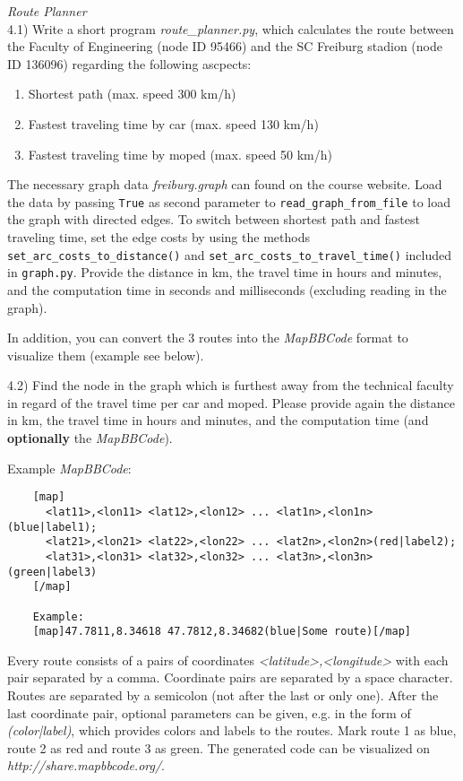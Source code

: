   \textit{Route Planner}\\
4.1)
Write a short program \emph{route\_planner.py}, which calculates the route between the Faculty of Engineering (node ID 95466) and the SC Freiburg stadion (node ID 136096) regarding the following ascpects:

\begin{enumerate} \itemsep-2pt
	\item Shortest path (max. speed 300 km/h)
	\item Fastest traveling time by car (max. speed 130 km/h)
	\item Fastest traveling time by moped (max. speed 50 km/h)
\end{enumerate}

The necessary graph data \emph{freiburg.graph} can found on the course website.
Load the data by passing \texttt{True} as second parameter to \texttt{read\_graph\_from\_file} to load the graph with directed edges.
To switch between shortest path and fastest traveling time, set the edge costs by using the methods \texttt{set\_arc\_costs\_to\_distance()} and \texttt{set\_arc\_costs\_to\_travel\_time()} included in \texttt{graph.py}.
Provide the distance in km, the travel time in hours and minutes, and the computation time in seconds and milliseconds (excluding reading in the graph).

In addition, you can convert the 3 routes into the \emph{MapBBCode} format to visualize them (example see below).

4.2)
Find the node in the graph which is furthest away from the technical
faculty in regard of the travel time per car and moped.
Please provide again the distance in km, the travel time in hours and minutes, and the computation time (and \textbf{optionally} the \emph{MapBBCode}).

Example \emph{MapBBCode}:
\begin{center}
  \small\begin{verbatim}
    [map]
      <lat11>,<lon11> <lat12>,<lon12> ... <lat1n>,<lon1n>(blue|label1);
      <lat21>,<lon21> <lat22>,<lon22> ... <lat2n>,<lon2n>(red|label2);
      <lat31>,<lon31> <lat32>,<lon32> ... <lat3n>,<lon3n>(green|label3)
    [/map]

    Example:
    [map]47.7811,8.34618 47.7812,8.34682(blue|Some route)[/map]
  \end{verbatim}
\end{center}

Every route consists of a pairs of coordinates \emph{<latitude>,<longitude>}
with each pair separated by a comma.
Coordinate pairs are separated by a space character. Routes are separated by
a semicolon (not after the last or only one).
After the last coordinate pair, optional parameters can be given, e.g. in the form of \emph{(color|label)}, which provides colors and labels to the routes.
Mark route 1 as blue, route 2 as red and route 3 as green.
The generated code can be visualized on \emph{http://share.mapbbcode.org/}.
